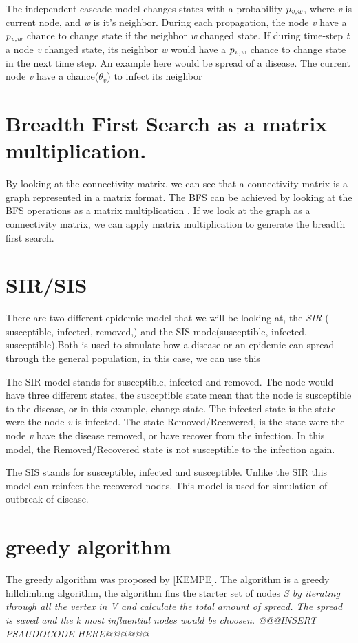 The independent cascade model changes states with a probability $p_{\it v, w}$, where {\it v }is current node, and {\it w} is it's neighbor. During each propagation, the node {\it v} have a  $p_{\it v, w}$ chance to change state if the neighbor {\it w} changed state. If during time-step {\it t} a node {\it v} changed state, its neighbor {\it w} would have a  $p_{\it v, w}$ chance to change state in the next time step. An example here would be spread of a disease. The current node {\it v} have a chance($\theta_v$) to infect its neighbor

\section{Breadth First Search as a matrix multiplication.}
By looking at the 	connectivity matrix, we can see that a connectivity matrix is a graph represented in a matrix format. The BFS can be achieved by looking at the BFS operations as a matrix multiplication \cite{algoToMath}. If we look at the graph as a connectivity matrix, we can apply matrix multiplication to generate the breadth first search. 

\section{SIR/SIS}
There are two different epidemic model that we will be looking at, the {\it SIR} ( susceptible, infected, removed,) and the SIS mode(susceptible, infected, susceptible).Both is used to simulate how a disease or an epidemic can spread through the general population, in this case, we can use this 

The SIR model stands for susceptible, infected and removed. The node would have three different states, the susceptible state mean that the node is susceptible to the disease, or in this example, change state. The infected state is the state were the node {\it v} is infected. The state Removed/Recovered, is the state were the node {\it v} have the disease removed, or have recover from the infection. In this model, the Removed/Recovered state is not susceptible to the infection again. 

The SIS stands for susceptible, infected and susceptible. Unlike the SIR this model can reinfect the recovered nodes. This model is used for simulation of outbreak of disease. 

\section{greedy algorithm}
The greedy algorithm was proposed by [KEMPE]. The algorithm is a greedy hillclimbing algorithm, the algorithm fins the starter set of nodes \it{S} by iterating through all the vertex in \it{V} and calculate the total amount of spread. The spread is saved and the \it{k} most influential nodes would be choosen. @@@INSERT PSAUDOCODE HERE@@@@@@ 



